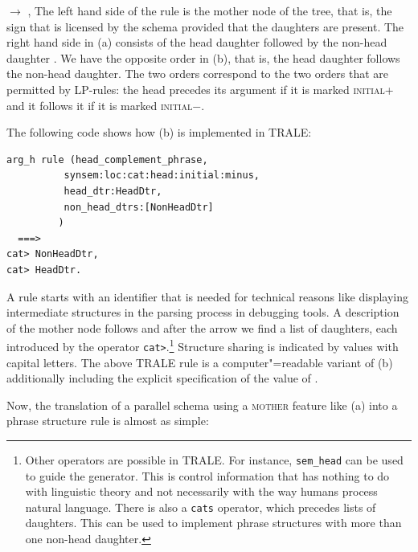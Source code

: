 \ex {} $\to$ , 
\zl
The left hand side of the rule is the mother node of the tree, that is, the sign that is licensed by
the schema provided that the daughters are present. The right hand side in (a) consists of
the head daughter  followed by the non-head daughter . We have the opposite order
in (b), that is, the head daughter follows the non-head daughter. The two orders correspond
to the two orders that are permitted by LP-rules: the head precedes its argument if it is marked
\textsc{initial}+ and it follows it if it is marked \textsc{initial}$-$.

The following code shows how (b) is implemented in TRALE:
\begin{verbatim}
arg_h rule (head_complement_phrase,
          synsem:loc:cat:head:initial:minus,
          head_dtr:HeadDtr,
          non_head_dtrs:[NonHeadDtr]
         )
  ===>
cat> NonHeadDtr,
cat> HeadDtr.
\end{verbatim}
A rule starts with an identifier that is needed for technical reasons like displaying intermediate
structures in the parsing process in debugging tools. A description of the mother node follows and
after the arrow we find a list of daughters, each introduced by the operator \verb+cat>+.\footnote{%
  Other operators are possible in TRALE. For instance, \texttt{sem\_head} can be used to guide the
  generator. This is control information that has nothing to do with linguistic theory and not
  necessarily with the way humans process natural language. There is also a \texttt{cats} operator,
  which precedes lists of daughters. This can be used to implement phrase structures with more than
  one non-head daughter.%
}
Structure sharing is indicated by values with capital letters. The above TRALE rule is a
computer"=readable variant of (b) additionally including the explicit specification of the value of {\initial}.  

Now, the translation of a parallel schema using a \textsc{mother} feature like (a) into a phrase structure rule is almost as simple:
\eal
\ex {}

